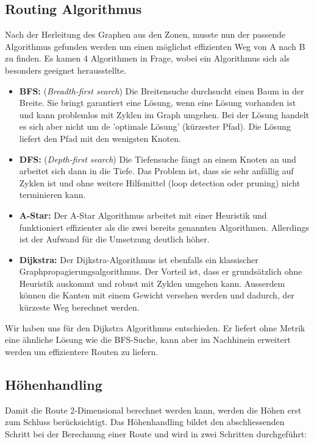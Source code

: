 \subsection{Routing Algorithmus}
Nach der Herleitung des Graphen aus den Zonen, musste nun der passende Algorithmus gefunden werden um einen möglichst effizienten Weg von A nach B zu finden. Es kamen 4 Algorithmen in Frage, wobei ein Algorithmus sich als besonders geeignet herausstellte.
\begin{itemize}
	\item{\textbf{BFS:} (\textit{Breadth-first search}) Die Breitensuche durchsucht einen Baum in der Breite. Sie bringt garantiert eine Lösung, wenn eine Lösung vorhanden ist und kann problemlos mit Zyklen im Graph umgehen. Bei der Lösung handelt es sich aber nicht um de 'optimale Lösung' (kürzester Pfad). Die Lösung liefert den Pfad mit den wenigsten Knoten. \cite{AiClass}}
	\item{\textbf{DFS:} (\textit{Depth-first search}) Die Tiefensuche fängt an einem Knoten an und arbeitet sich dann in die Tiefe. Das Problem ist, dass sie sehr anfällig auf Zyklen ist und ohne weitere Hilfsmittel (loop detection oder pruning) nicht terminieren kann. \cite{AiClass}}
	\item{\textbf{A-Star:} Der A-Star Algorithmus arbeitet mit einer Heuristik und funktioniert effizienter als die zwei bereits genannten Algorithmen. Allerdings ist der Aufwand für die Umsetzung deutlich höher. \cite{AiClass}}
	\item{\textbf{Dijkstra:} Der Dijkstra-Algorithmus ist ebenfalls ein klassischer Graphpropagierungsalgorithmus. Der Vorteil ist, dass er grundsätzlich ohne Heuristik auskommt und robust mit Zyklen umgehen kann. Ausserdem können die Kanten mit einem Gewicht versehen werden und dadurch, der kürzeste Weg berechnet werden.}
\end{itemize}
Wir haben uns für den Dijkstra Algorithmus entschieden. Er liefert ohne Metrik eine ähnliche Lösung wie die BFS-Suche, kann aber im Nachhinein erweitert werden um effizientere Routen zu liefern.

\subsection{Höhenhandling}
Damit die Route 2-Dimensional berechnet werden kann, werden die Höhen erst zum Schluss berücksichtigt. Das Höhenhandling bildet den abschliessenden Schritt bei der Berechnung einer Route und wird in zwei Schritten durchgeführt:

